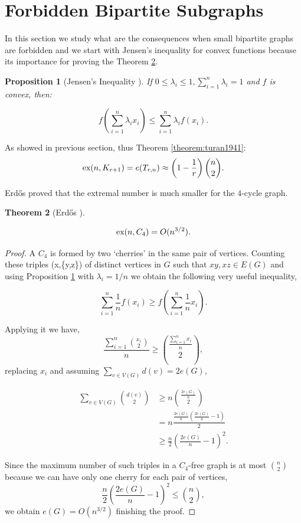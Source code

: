 \documentclass[12pt,twoside,a4paper,bibliography=totocnumbered]{book}
\numberwithin{equation}{section}
\newtheorem{theorem}             {Theorem}[section]
\newtheorem{proposition}[theorem] {Proposition}
\theoremstyle{remark}
\def\ex{\mathop{\text{\rm ex}}\nolimits}
\begin{document}
\section{Forbidden Bipartite Subgraphs}
In this section we study what are the consequences when small bipartite graphs are forbidden and we start with Jensen's inequality for convex functions because its importance for proving the Theorem \ref{theorem: Erdos,1938}.
\begin{proposition}[{Jensen's Inequality \cite{Je06}}]\label{prep:jensen}
 If $0\leq \lambda_i \leq 1, \sum_{i=1}^n \lambda_i = 1$ and $f$ is convex, then:

$$
f \left( \sum_{i=1}^n \lambda_i x_i\right) \leq \sum_{i=1}^n \lambda_i f (x_i).
$$

\end{proposition}

As showed in previous section, thus Theorem \ref{theorem:turan1941}:
$$ \ex (n,K_{r+1}) = e(T_{r,n}) \approx \left( 1-\frac{1}{r}\right) \binom{n}{2} .$$

Erd\H{o}s proved that the extremal number is much smaller for the $4$-cycle graph.
 
\begin{theorem}[{Erd\H{o}s \cite{Er38}}] \label{theorem: Erdos,1938}

$$\ex(n,C_4) = O(n^{3/2}).$$
\end{theorem}

\begin{proof}
A $C_4$ is formed by two `cherries' in the same pair of vertices. Counting these triples (x,\{y,z\}) of distinct vertices in $G$ such that $xy, xz \in E(G)$ and using Proposition \ref{prep:jensen} with $\lambda_i = 1/n$ we obtain the following very useful inequality,

$$ \sum_{i=1}^n \frac{1}{n} f\left(x_i\right) \geq f\left(\sum_{i=1}^n \frac{1}{n} x_i\right).$$

Applying it we have,
$$ \frac{\sum_{i=1}^n \binom{x_i}{2}}{n} \geq \binom{\frac{\sum_{i=1}^n x_i}{n}}{2} ,$$
replacing $x_i$ and assuming $\sum_{v \in V(G)} d(v) = 2e(G),$

\begin{align*}
\sum_{v \in V(G)} \binom{d(v)}{2} &\geq n \binom{\frac{2e(G)}{n}}{2}\\
&= n\frac{\frac{2e(G)}{n}\left( \frac{2e(G)}{n}-1\right)}{2} \\
&\geq \frac{n}{2} \left( \frac{2e(G)}{n} - 1 \right)^2.
\end{align*}

Since the maximum number of such triples in a $C_4$-free graph is at most $\binom{n}{2}$ because we can have only one cherry for each pair of vertices,
$$ \frac{n}{2}\left(\frac{2e(G)}{n} - 1\right)^2 \leq \binom{n}{2},$$
we obtain $e(G) = O(n^{3/2})$ finishing the proof.
\end{proof}
\end{document}
